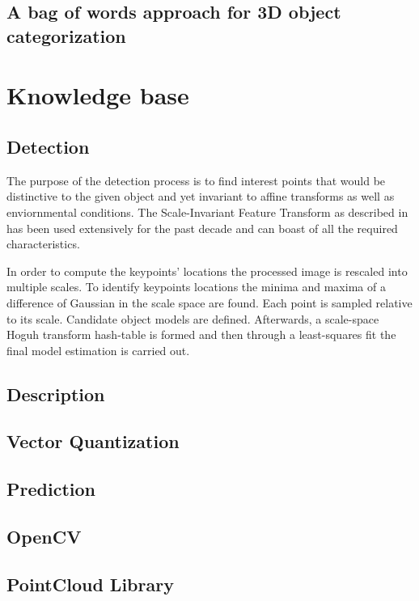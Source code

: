 \documentclass[a4paper,10pt]{article}
\begin{document}
\subsection{A bag of words approach for 3D object categorization}

\section{Knowledge base}

\subsection{Detection}

    The purpose of the detection process is to find interest points that would be distinctive to the given object and yet
    invariant to affine transforms as well as enviornmental conditions. The Scale-Invariant Feature Transform as described
    in \cite{lowe1999object} has been used extensively for the past decade and can boast of all the required characteristics.
    
    In order to compute the keypoints' locations the processed image is rescaled into multiple scales. To identify keypoints 
    locations the minima and maxima of a difference of Gaussian in the scale space are found. Each point is sampled relative to 
    its scale. Candidate object models are defined. Afterwards, a scale-space Hoguh transform hash-table is formed and then through
    a least-squares fit the final model estimation is carried out.

\subsection{Description}
\subsection{Vector Quantization}
\subsection{Prediction}

\subsection{OpenCV}
\subsection{PointCloud Library}
\end{document}
